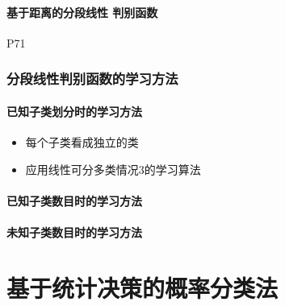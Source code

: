 \documentclass[11pt]{book}
\begin{document}
\subsubsection{基于距离的分段线性
判别函数}%
\label{ssub:ji_yu_ju_chi_de_fen_duan_xian_xing_pan_bie_han_shu_}

P71

\subsection{分段线性判别函数的学习方法}

\subsubsection{已知子类划分时的学习方法}%

\begin{itemize}
	\item 每个子类看成独立的类
	\item 应用线性可分多类情况3的学习算法
\end{itemize}
\subsubsection{已知子类数目时的学习方法}%
\label{ssub:yi_zhi_zi_lei_shu_mu_shi_de_xue_xi_fang_fa_}

\subsubsection{未知子类数目时的学习方法}%
\label{ssub:wei_zhi_zi_lei_shu_mu_shi_de_xue_xi_fang_fa_}



\chapter{基于统计决策的概率分类法}


\label{ssub:yi_zhi_zi_lei_hua_fen_shi_de_xue_xi_fang_fa_}
\end{document}
